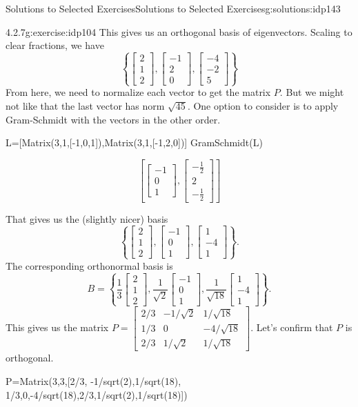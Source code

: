 \documentclass[oneside,10pt,]{book}
\numberwithin{equation}{section}
\newcommand{\bbm}{\begin{bmatrix}}
\newcommand{\ebm}{\end{bmatrix}}
\newcommand{\amp}{&}
\begin{document}
\begin{solutions-chapter}{Solutions to Selected Exercises}{}{Solutions to Selected Exercises}{}{}{g:solutions:idp143}
\begin{inlinesolution}{4.2.7}{}{g:exercise:idp104}
This gives us an orthogonal basis of eigenvectors. Scaling to clear fractions, we have%
\begin{equation*}
\left\{\bbm 2\\1\\2\ebm, \bbm -1\\2\\0\ebm, \bbm -4\\-2\\5\ebm\right\}
\end{equation*}
From here, we need to normalize each vector to get the matrix \(P\). But we might not like that the last vector has norm \(\sqrt{45}\). One option to consider is to apply Gram-Schmidt with the vectors in the other order.%
\begin{sageinput}
L=[Matrix(3,1,[-1,0,1]),Matrix(3,1,[-1,2,0])]
GramSchmidt(L)
\end{sageinput}
\begin{sageoutput}
\[\left[\bbm -1\\0\\1\ebm, \bbm -\frac12\\2\\-\frac12\ebm\right]\]
\end{sageoutput}
That gives us the (slightly nicer) basis%
\begin{equation*}
\left\{\bbm 2\\1\\2\ebm, \bbm -1\\0\\1\ebm, \bbm 1\\-4\\1\ebm\right\}\text{.}
\end{equation*}
The corresponding orthonormal basis is%
\begin{equation*}
B = \left\{\frac{1}{3}\bbm 2\\1\\2\ebm, \frac{1}{\sqrt{2}}\bbm -1\\0\\1\ebm, \frac{1}{\sqrt{18}}\bbm 1\\-4\\1\ebm\right\}\text{.}
\end{equation*}
This gives us the matrix \(P=\bbm 2/3\amp -1/\sqrt{2}\amp 1/\sqrt{18}\\1/3\amp 0 \amp -4/\sqrt{18}\\2/3\amp 1/\sqrt{2}\amp 1/\sqrt{18}\ebm\). Let's confirm that \(P\) is orthogonal.%
\begin{sageinput}
P=Matrix(3,3,[2/3, -1/sqrt(2),1/sqrt(18), 1/3,0,-4/sqrt(18),2/3,1/sqrt(2),1/sqrt(18)])

\end{sageinput}
\end{inlinesolution}
\end{solutions-chapter}
\end{document}
